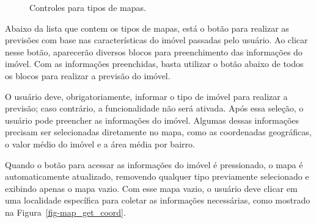 \documentclass[
  12pt,
  a4paper,
]{scrreprt}
\begin{document}
\begin{figure}


\caption{\label{fig-menu_map}Controles para tipos de mapas.}

\end{figure}%

Abaixo da lista que contem os tipos de mapas, está o botão para realizar
as previsões com base nas características do imóvel passadas pelo
usuário. Ao clicar nesse botão, aparecerão diversos blocos para
preenchimento das informações do imóvel. Com as informações preenchidas,
basta utilizar o botão abaixo de todos os blocos para realizar a
previsão do imóvel.

\vspace{12pt}

O usuário deve, obrigatoriamente, informar o tipo de imóvel para
realizar a previsão; caso contrário, a funcionalidade não será ativada.
Após essa seleção, o usuário pode preencher as informações do imóvel.
Algumas dessas informações precisam ser selecionadas diretamente no
mapa, como as coordenadas geográficas, o valor médio do imóvel e a área
média por bairro.

\vspace{12pt}

Quando o botão para acessar as informações do imóvel é pressionado, o
mapa é automaticamente atualizado, removendo qualquer tipo previamente
selecionado e exibindo apenas o mapa vazio. Com esse mapa vazio, o
usuário deve clicar em uma localidade específica para coletar as
informações necessárias, como mostrado na
Figura~\ref{fig-map_get_coord}.
\end{document}
